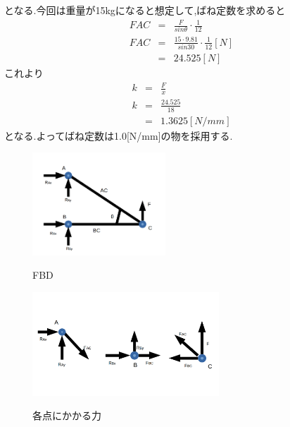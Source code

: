 \documentclass[a4paper]{jarticle}
\begin{document}
となる.今回は重量が15kgになると想定して,ばね定数を求めると
\begin{eqnarray}
	FAC & = & \frac{F}{sinθ}\cdot \frac{1}{12} \\
	FAC & = & \frac{15 \cdot  9.81}{sin30}\cdot \frac{1}{12} [N] \\
	     & =& 24.525[N] 
\end{eqnarray}
	{これより}　
\begin{eqnarray}
	k& = &  \frac{F}{x} \\
	k& = &  \frac{24.525}{18} \\
	 & = & 1.3625 [N/mm]
\end{eqnarray}
となる.よってばね定数は1.0[N/mm]の物を採用する.

\begin{figure}[htp]
 \begin{center}
  \includegraphics[width=50mm]{img/fig7.png}
 　\caption{FBD}
  \label{fig:fbd}%
 \end{center}
\end{figure}

\begin{figure}[htp]
 \begin{center}
  \includegraphics[width=70mm]{img/fig8.png}
 　\caption{各点にかかる力}
  \label{fig:bai}%
 \end{center}
\end{figure}

\end{document}
